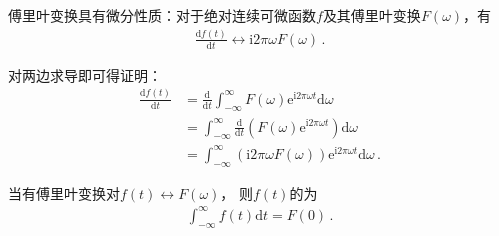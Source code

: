 \begin{theorem}
    傅里叶变换具有微分性质：对于绝对连续可微函数$f$及其傅里叶变换$F(\omega)$，有
    \begin{align}
        \frac{\mathrm{d}f(t)}{\mathrm{d}t}\leftrightarrow\mathrm{i}2\pi\omega F(\omega)\, .
    \end{align}
\end{theorem}
\begin{prove}
    对两边求导即可得证明：
    \begin{align}
        \frac{\mathrm{d}f(t)}{\mathrm{d}t} & =\frac{\mathrm{d}}{\mathrm{d}t}\int_{-\infty}^{\infty}F(\omega)\mathrm{e}^{\mathrm{i}2\pi\omega t}\mathrm{d}\omega\nonumber              \\
                                           & =\int_{-\infty}^{\infty}\frac{\mathrm{d}}{\mathrm{d}t}\left(F(\omega)\mathrm{e}^{\mathrm{i}2\pi\omega t}\right)\mathrm{d}\omega\nonumber \\
                                           & =\int_{-\infty}^{\infty}(\mathrm{i}2\pi\omega F(\omega))\mathrm{e}^{\mathrm{i}2\pi\omega t}\mathrm{d}\omega\, .
    \end{align}
\end{prove}

\begin{theorem}
    当有傅里叶变换对$f(t)\leftrightarrow F(\omega)$，
    则$f(t)$的为
    \begin{align}
        \int_{-\infty}^{\infty}f(t)\mathrm{d}t=F(0)\, .
    \end{align}
\end{theorem}

